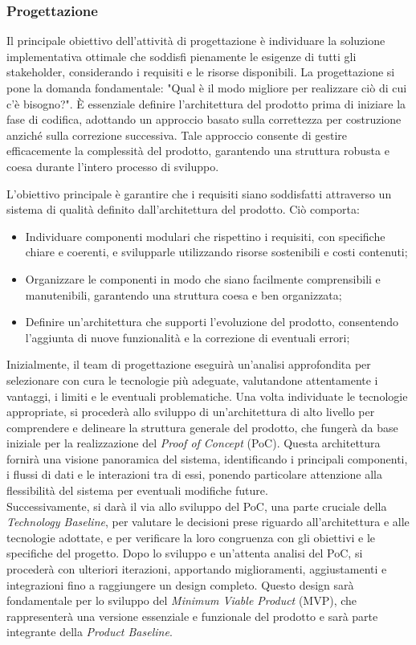 \subsubsection{Progettazione}
Il principale obiettivo dell'attività di progettazione è individuare la soluzione implementativa ottimale che soddisfi pienamente le esigenze di tutti gli stakeholder, considerando i requisiti e le risorse disponibili. La progettazione si pone la domanda fondamentale: "Qual è il modo migliore per realizzare ciò di cui c'è bisogno?". È essenziale definire l'architettura del prodotto prima di iniziare la fase di codifica, adottando un approccio basato sulla correttezza per costruzione anziché sulla correzione successiva. Tale approccio consente di gestire efficacemente la complessità del prodotto, garantendo una struttura robusta e coesa durante l'intero processo di sviluppo.

L'obiettivo principale è garantire che i requisiti siano soddisfatti attraverso un sistema di qualità definito dall'architettura del prodotto. Ciò comporta:
\begin{itemize}
	\item Individuare componenti modulari che rispettino i requisiti, con specifiche chiare e coerenti, e svilupparle utilizzando risorse sostenibili e costi contenuti;
	\item Organizzare le componenti in modo che siano facilmente comprensibili e manutenibili, garantendo una struttura coesa e ben organizzata;
	\item Definire un'architettura che supporti l'evoluzione del prodotto, consentendo l'aggiunta di nuove funzionalità e la correzione di eventuali errori;
\end{itemize}
Inizialmente, il team di progettazione eseguirà un'analisi approfondita per selezionare con cura le tecnologie più adeguate, valutandone attentamente i vantaggi, i limiti e le eventuali problematiche. Una volta individuate le tecnologie appropriate, si procederà allo sviluppo di un'architettura di alto livello per comprendere e delineare la struttura generale del prodotto, che fungerà da base iniziale per la realizzazione del \textit{Proof of Concept} (PoC). Questa architettura fornirà una visione panoramica del sistema, identificando i principali componenti, i flussi di dati e le interazioni tra di essi, ponendo particolare attenzione alla flessibilità del sistema per eventuali modifiche future. \\Successivamente, si darà il via allo sviluppo del PoC, una parte cruciale della \textit{Technology Baseline}, per valutare le decisioni prese riguardo all'architettura e alle tecnologie adottate, e per verificare la loro congruenza con gli obiettivi e le specifiche del progetto. Dopo lo sviluppo e un'attenta analisi del PoC, si procederà con ulteriori iterazioni, apportando miglioramenti, aggiustamenti e integrazioni fino a raggiungere un design completo. Questo design sarà fondamentale per lo sviluppo del \textit{Minimum Viable Product} (MVP), che rappresenterà una versione essenziale e funzionale del prodotto e sarà parte integrante della \textit{Product Baseline}.

